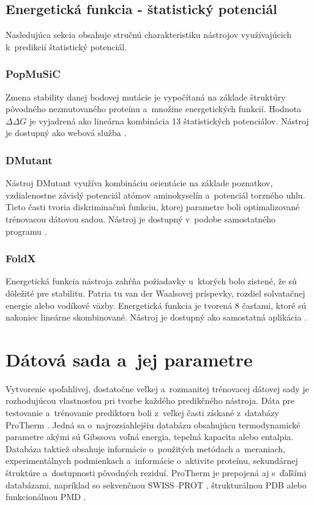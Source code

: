 \section{Energetická funkcia - štatistický potenciál}

Nasledujúca sekcia obsahuje stručnú charakteristiku nástrojov využívajúcich k~predikcií štatistický potenciál.

\subsection{PopMuSiC}

Zmena stability danej bodovej mutácie je vypočítaná na základe štruktúry pôvodného nezmutovaného proteínu a~množine energetických funkcií. Hodnota $\Delta\Delta G$ je vyjadrená ako lineárna kombinácia 13 štatistických potenciálov. Nástroj je dostupný ako webová služba \cite{popmusic}.


\subsection{DMutant}

Nástroj DMutant využíva kombináciu orientácie na základe poznatkov, vzdialenostne závislý potenciál atómov aminokyselín a~potenciál torzného uhlu. Tieto časti tvoria diskriminačnú funkciu, ktorej parametre boli optimalizované trénovacou dátovou sadou. Nástroj je dostupný v~podobe samostatného programu \cite{dmutant}.

\subsection{FoldX}

Energetická funkcia nástroja zahŕňa požiadavky u~ktorých bolo zistené, že sú dôležité pre stabilitu. Patria tu van der Waalsovej príspevky, rozdiel solvatačnej energie alebo vodíkové väzby. Energetická funkcia je tvorená 8 časťami, ktoré sú nakoniec lineárne skombinované. Nástroj je dostupný ako samostatná aplikácia \cite{foldx}.


\chapter{Dátová sada a~jej parametre}

Vytvorenie spoľahlivej, dostatočne veľkej a~rozmanitej trénovacej dátovej sady je rozhodujúcou vlastnosťou pri tvorbe každého predikčného nástroja. Dáta pre testovanie a~trénovanie prediktoru boli z~veľkej časti získané z~databázy ProTherm \cite{protherm}. Jedná sa o~najrozsiahlejšiu databázu obsahujúcu termodynamické parametre akými sú Gibssova voľná energia, tepelná kapacita alebo entalpia. Databáza taktiež obsahuje informácie o~použitých metódach a~meraniach, experimentálnych podmienkach a~informácie o~aktivite proteínu, sekundárnej štruktúre a~dostupnosti pôvodných reziduí. ProTherm je prepojená aj s~ďaľšími databázami, napríklad so sekvenčnou SWISS--PROT \cite{swissprot}, štrukturálnou PDB \cite{pdb} alebo funkcionálnou PMD \cite{pmd}.


